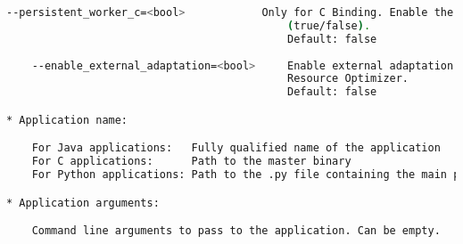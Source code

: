 \begin{lstlisting}[language=bash]
    --persistent_worker_c=<bool>            Only for C Binding. Enable the persistent worker in c
                                            (true/false).
                                            Default: false
                                            
    --enable_external_adaptation=<bool>     Enable external adaptation. This option will disable the
                                            Resource Optimizer.
                                            Default: false

* Application name:

    For Java applications:   Fully qualified name of the application
    For C applications:      Path to the master binary
    For Python applications: Path to the .py file containing the main program

* Application arguments:

    Command line arguments to pass to the application. Can be empty.
\end{lstlisting}

